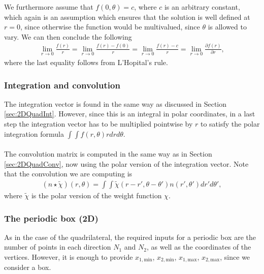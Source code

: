 We furthermore assume that $f(0, \theta)=c$, where $c$ is an arbitrary constant, which again is an assumption which ensures that the solution is well defined at $r=0$, since otherwise the function would be multivalued, since $\theta$ is allowed to vary.
We can then conclude the following
\begin{align*}
	\lim_{r \to 0}\frac{f(r)}{r} = \lim_{r \to 0} \frac{f(r) - f(0)}{r} = \lim_{r \to 0} \frac{f(r) - c}{r} = \lim_{r \to 0} \frac{\partial f(r)}{\partial r},
\end{align*}
where the last equality follows from L'Hopital's rule.
\subsubsection*{Integration and convolution}
The integration vector is found in the same way as discussed in Section \ref{sec:2DQuadInt}. However, since this is an integral in polar coordinates, in a last step the integration vector has to be multiplied pointwise by $r$ to satisfy the polar integration formula $\int \int f(r, \theta) r dr d\theta$.
\\
\\
The convolution matrix is computed in the same way as in Section \ref{sec:2DQuadConv}, now using the polar version of the integration vector. 
Note that the convolution we are computing is
\begin{align*}
	\left(n \star \tilde \chi \right) (r, \theta) = \int \int \tilde \chi (r - r', \theta - \theta') n (r',\theta') d r' d\theta',
\end{align*}
where $\tilde \chi$ is the polar version of the weight function $\chi$.
\subsubsection{The periodic box (2D)}
As in the case of the quadrilateral, the required inputs for a periodic box are the number of points in each direction $N_1$ and $N_2$, as well as the coordinates of the vertices. However, it is enough to provide $x_{1,\text{min}}$, $x_{2,\text{min}}$, $x_{1,\text{max}}$, $x_{2,\text{max}}$, since we consider a box.

